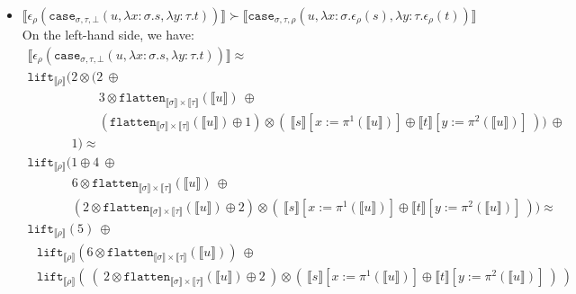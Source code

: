 \documentclass[a4paper,UKenglish,cleveref,autoref,numberwithinsect]{lipics-v2019}
\theoremstyle{definition}
\newcommand{\abs}[2]{\lambda #1.#2}
\newcommand{\flatten}{\mathtt{flatten}}
\newcommand{\lift}{\mathtt{lift}}
\newcommand{\typeinterpret}[1]{\llbracket #1 \rrbracket}
\newcommand{\interpret}[1]{\llbracket #1 \rrbracket}
\begin{document}
\begin{itemize}
\item $\interpret{\epsilon_\rho(\mathtt{case}_{\sigma,\tau,\bot}(u,
  \abs{x:\sigma}{s},\abs{y:\tau}{t}))} \succ
  \interpret{\mathtt{case}_{\sigma,\tau,\rho}(u,
  \abs{x:\sigma}{\epsilon_\rho(s)},\abs{y:\tau}{\epsilon_\rho(t)})}$ \\
  On the left-hand side, we have:
  \[
  \begin{array}{l}
  \interpret{\epsilon_\rho(\mathtt{case}_{\sigma,\tau,\bot}(u,
  \abs{x:\sigma}{s},\abs{y:\tau}{t}))} \approx \\
  \lift_{\typeinterpret{\rho}}(2 \otimes (
  2\ \oplus \\
  \phantom{ABCDEFG,}
  3 \otimes \flatten_{\typeinterpret{\sigma} \times
    \typeinterpret{\tau}}(\interpret{u})\ \oplus \\
  \phantom{ABCDEFG,}
  (\flatten_{\typeinterpret{\sigma} \times \typeinterpret{\tau}}(
    \interpret{u}) \oplus 1) \otimes (\
      \interpret{s}[x:=\pi^1(\interpret{u})] \oplus
      \interpret{t}[y:=\pi^2(\interpret{u})]\ )
  )\ \oplus \\
  \phantom{ABCD,} 1) \approx \\
  \lift_{\typeinterpret{\rho}}(
  1 \oplus 4\ \oplus \\
    \phantom{ABCDe}
    6 \otimes \flatten_{\typeinterpret{\sigma} \times
    \typeinterpret{\tau}}(\interpret{u})\ \oplus \\
    \phantom{ABCDe}
  (2 \otimes \flatten_{\typeinterpret{\sigma} \times \typeinterpret{\tau}}(
    \interpret{u}) \oplus 2) \otimes (\
      \interpret{s}[x:=\pi^1(\interpret{u})] \oplus
      \interpret{t}[y:=\pi^2(\interpret{u})]\ )) \approx \\
  \lift_{\typeinterpret{\rho}}(5)\ \oplus \\
  \phantom{A}
    \lift_{\typeinterpret{\rho}}(6 \otimes
      \flatten_{\typeinterpret{\sigma} \times
      \typeinterpret{\tau}}(\interpret{u}))\ \oplus \\
  \phantom{A}
    \lift_{\typeinterpret{\rho}}(\
      (\ 2 \otimes \flatten_{\typeinterpret{\sigma} \times
      \typeinterpret{\tau}}(\interpret{u}) \oplus 2\ ) \otimes
      (\ \interpret{s}[x:=\pi^1(\interpret{u})] \oplus
      \interpret{t}[y:=\pi^2(\interpret{u})]\ )\ )
  \end{array}
  \]


\end{itemize}
\end{document}
